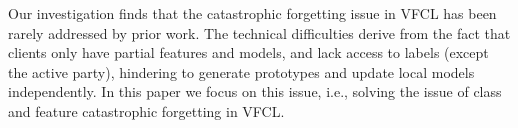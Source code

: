 Our investigation finds that the catastrophic forgetting issue in VFCL has been rarely addressed by prior work. 
The technical difficulties derive from the fact that  clients only have partial features and models, and lack access to labels (except the active party), hindering to generate prototypes and update local models independently.
In this paper we focus on this issue, i.e., solving the issue of class and feature catastrophic forgetting in VFCL.


